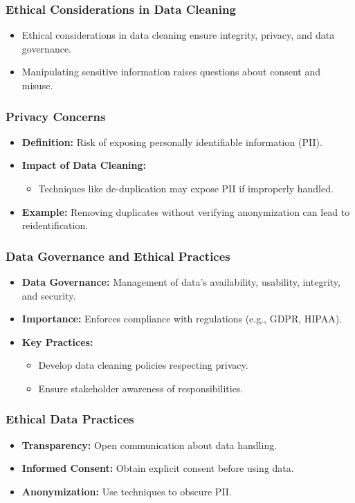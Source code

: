 \documentclass[aspectratio=169]{beamer}
\begin{document}
\begin{frame}[fragile]
    \frametitle{Ethical Considerations in Data Cleaning}
    \begin{itemize}
        \item Ethical considerations in data cleaning ensure integrity, privacy, and data governance.
        \item Manipulating sensitive information raises questions about consent and misuse.
    \end{itemize}
\end{frame}

\begin{frame}[fragile]
    \frametitle{Privacy Concerns}
    \begin{itemize}
        \item \textbf{Definition:} Risk of exposing personally identifiable information (PII).
        \item \textbf{Impact of Data Cleaning:}
        \begin{itemize}
            \item Techniques like de-duplication may expose PII if improperly handled.
        \end{itemize}
        \item \textbf{Example:} Removing duplicates without verifying anonymization can lead to reidentification.
    \end{itemize}
\end{frame}

\begin{frame}[fragile]
    \frametitle{Data Governance and Ethical Practices}
    \begin{itemize}
        \item \textbf{Data Governance:} Management of data's availability, usability, integrity, and security.
        \item \textbf{Importance:} Enforces compliance with regulations (e.g., GDPR, HIPAA).
        \item \textbf{Key Practices:}
        \begin{itemize}
            \item Develop data cleaning policies respecting privacy.
            \item Ensure stakeholder awareness of responsibilities.
        \end{itemize}
    \end{itemize}
\end{frame}

\begin{frame}[fragile]
    \frametitle{Ethical Data Practices}
    \begin{itemize}
        \item \textbf{Transparency:} Open communication about data handling.
        \item \textbf{Informed Consent:} Obtain explicit consent before using data.
        \item \textbf{Anonymization:} Use techniques to obscure PII.
    \end{itemize}
\end{frame}
\end{document}
